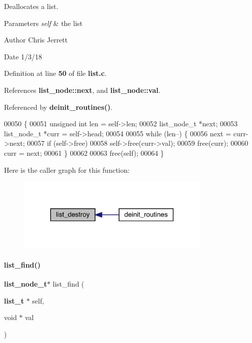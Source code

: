 Deallocates a list. 


\begin{DoxyParams}{Parameters}
{\em self} & the list \\
\hline
\end{DoxyParams}
\begin{DoxyAuthor}{Author}
Chris Jerrett 
\end{DoxyAuthor}
\begin{DoxyDate}{Date}
1/3/18 
\end{DoxyDate}


Definition at line \textbf{ 50} of file \textbf{ list.\+c}.



References \textbf{ list\+\_\+node\+::next}, and \textbf{ list\+\_\+node\+::val}.



Referenced by \textbf{ deinit\+\_\+routines()}.


\begin{DoxyCode}
00050                                 \{
00051   \textcolor{keywordtype}{unsigned} \textcolor{keywordtype}{int} len = \textcolor{keyword}{self}->len;
00052   list_node_t *next;
00053   list_node_t *curr = \textcolor{keyword}{self}->head;
00054 
00055   \textcolor{keywordflow}{while} (len--) \{
00056     next = curr->next;
00057     \textcolor{keywordflow}{if} (self->free)
00058       \textcolor{keyword}{self}->free(curr->val);
00059     free(curr);
00060     curr = next;
00061   \}
00062 
00063   free(\textcolor{keyword}{self});
00064 \}
\end{DoxyCode}
Here is the caller graph for this function\+:\nopagebreak
\begin{figure}[H]
\begin{center}
\leavevmode
\includegraphics[width=264pt]{list_8c_ac2d2be572a896cccd0e76d56eeefcbdb_icgraph}
\end{center}
\end{figure}
\mbox{\label{list_8c_a5d73352b7bfa0c5a8b33289d7b27a374}} 
\paragraph{list\+\_\+find()}
{\footnotesize\ttfamily \textbf{ list\+\_\+node\+\_\+t}$\ast$ list\+\_\+find (\begin{DoxyParamCaption}\item[{\textbf{ list\+\_\+t} $\ast$}]{self,  }\item[{void $\ast$}]{val }\end{DoxyParamCaption})}



